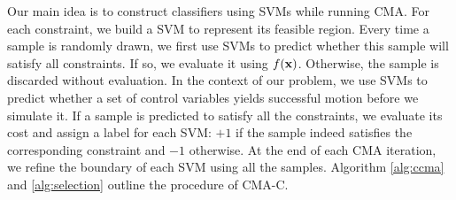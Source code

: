 



Our main idea is to construct classifiers using SVMs while running
CMA. For each constraint, we build a SVM to represent its feasible
region. Every time a sample is randomly drawn, we first use SVMs to
predict whether this sample will satisfy all constraints. If so, we
evaluate it using $f(\mathbf{x})$. Otherwise, the sample is discarded
without evaluation. In the context of our problem, we use SVMs to
predict whether a set of control variables yields successful motion
before we simulate it. If a sample is predicted to satisfy all the
constraints, we evaluate its cost and assign a label for each SVM:
$+1$ if the sample indeed satisfies the corresponding constraint and
$-1$ otherwise. At the end of each CMA iteration, we refine the
boundary of each SVM using all the samples. Algorithm \ref{alg:ccma}
and \ref{alg:selection} outline the procedure of CMA-C.

